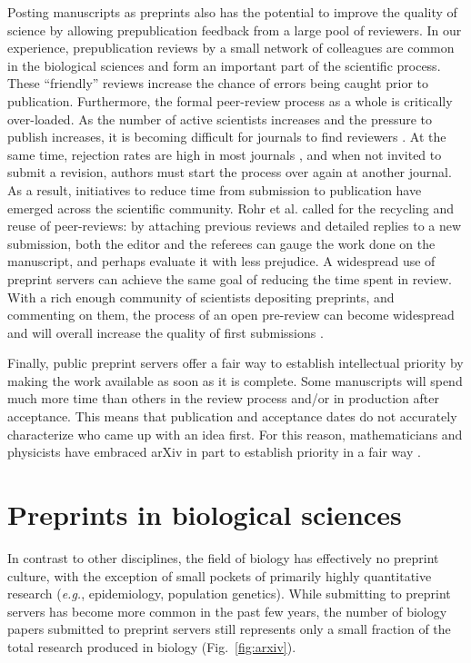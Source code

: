 \documentclass[10pt]{article}
\begin{document}
Posting manuscripts as preprints also has the potential to improve the 
quality of science by allowing prepublication feedback from a large pool of 
reviewers. In our experience, prepublication reviews by a small network of 
colleagues are common in the biological sciences and form an important part 
of the scientific process. These ``friendly'' reviews increase the chance 
of errors being caught prior to publication. Furthermore, the formal 
peer-review process as a whole is critically over-loaded. As the number of 
active scientists increases and the pressure to publish increases, it is 
becoming difficult for journals to find reviewers \cite{hoc09}.  At the same 
time, rejection rates are high in most journals \cite{aar08,roh09}, and when 
not invited to submit a revision, authors must start the process over again 
at another journal. As a result, initiatives to reduce time from submission 
to publication have emerged across the scientific community. Rohr et al.  
\cite{roh09} called for the recycling and reuse of peer-reviews: by 
attaching previous reviews and detailed replies to a new submission, both 
the editor and the referees can gauge the work done on the manuscript, and 
perhaps evaluate it with less prejudice. A widespread use of preprint 
servers can achieve the same goal of reducing the time spent in review. With 
a rich enough community of scientists depositing preprints, and commenting 
on them, the process of an open pre-review can become widespread and will 
overall increase the quality of first submissions \cite{hoc12}.

Finally, public preprint servers offer a fair way to establish intellectual
priority by making the work available as soon as it is complete. Some
manuscripts will spend much more time than others in the review process and/or in
production after acceptance. This means that publication and
acceptance dates do not accurately characterize who came up with an idea
first. For this reason, mathematicians and physicists have embraced arXiv in
part to establish priority in a fair way \cite{gin11,cal12}.

\section*{Preprints in biological sciences}

In contrast to other disciplines, the field of biology has effectively no
preprint culture, with the exception of small pockets of primarily highly
quantitative research (\emph{e.g.}, epidemiology, population genetics).  While
submitting to preprint servers has become more common in the past few years, the
number of biology papers submitted to preprint servers still represents only a
small fraction of the total research produced in biology (Fig.~\ref{fig:arxiv}).
\end{document}
